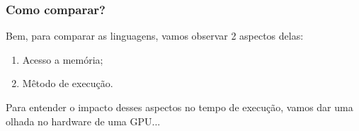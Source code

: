 \documentclass[brazil]{beamer}
\begin{document}

\begin{frame}[fragile]
  \frametitle{Como comparar?}
  Bem, para comparar as linguagens, vamos observar 2 aspectos delas:
  \begin{enumerate}
    \item Acesso a memória;
    \item Mêtodo de execução.
  \end{enumerate}
  Para entender o impacto desses aspectos no tempo de execução, vamos dar uma olhada no hardware de uma GPU...
\end{frame}
\end{document}
